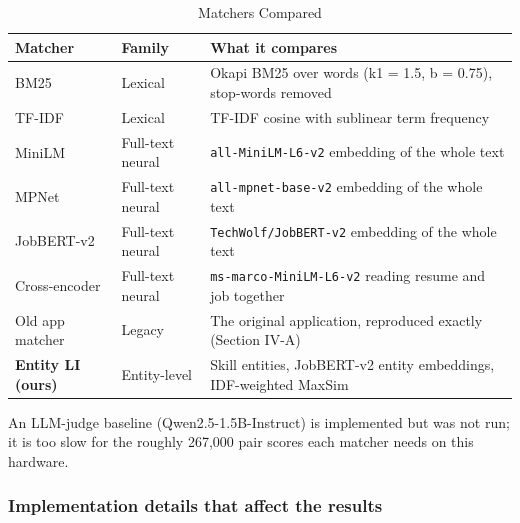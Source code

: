 \documentclass[conference,a4paper]{IEEEtran}
\begin{document}
\begin{table}[!t]
\caption{Matchers Compared}
\label{tab:9}
\centering
\footnotesize
\begin{tabularx}{\textwidth}{ll>{\raggedright\arraybackslash}X}
\hline
\textbf{Matcher} & \textbf{Family} & \textbf{What it compares} \\
\hline
BM25 & Lexical & Okapi BM25 over words (k1 = 1.5, b = 0.75), stop-words removed \\
TF-IDF & Lexical & TF-IDF cosine with sublinear term frequency \\
MiniLM & Full-text neural & \texttt{all-\allowbreak{}MiniLM-\allowbreak{}L6-\allowbreak{}v2} embedding of the whole text \\
MPNet & Full-text neural & \texttt{all-\allowbreak{}mpnet-\allowbreak{}base-\allowbreak{}v2} embedding of the whole text \\
JobBERT-v2 & Full-text neural & \texttt{TechWolf/\allowbreak{}JobBERT-\allowbreak{}v2} embedding of the whole text \\
Cross-encoder & Full-text neural & \texttt{ms-\allowbreak{}marco-\allowbreak{}MiniLM-\allowbreak{}L6-\allowbreak{}v2} reading resume and job together \\
Old app matcher & Legacy & The original application, reproduced exactly (Section IV-A) \\
\textbf{Entity LI (ours)} & Entity-level & Skill entities, JobBERT-v2 entity embeddings, IDF-weighted MaxSim \\
\hline
\end{tabularx}
\end{table}
An LLM-judge baseline (Qwen2.5-1.5B-Instruct) is implemented but was not run; it is too slow for the roughly 267,000 pair scores each matcher needs on this hardware.

\subsubsection{Implementation details that affect the results} 
\end{document}
